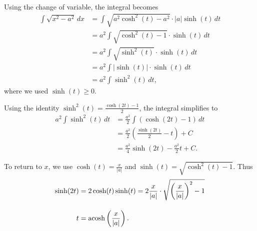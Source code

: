 

Using the change of variable, the integral becomes
\begin{align*}
   \int \sqrt{x^2 - a^2} \, dx  &=  \int \sqrt{a^2 \cosh^2(t) - a^2} \cdot |a| \sinh(t) \, dt \\[1em]
   &= a^2 \int \sqrt{\cosh^2(t) - 1} \cdot \sinh(t) \, dt \\[1em]
   &= a^2 \int \sqrt{\sinh^2(t)} \cdot \sinh(t) \, dt \\[1em]
     &= a^2 \int |\sinh(t)| \cdot \sinh(t) \, dt \\[1em]
    &= a^2 \int \sinh^2(t) \, dt,
\end{align*}
where we used $\sinh(t) \ge 0$.

Using the identity \( \sinh^2(t) = \frac{\cosh(2t) - 1}{2} \), the integral simplifies to
\begin{align*}
     a^2 \int \sinh^2(t) \, dt & = \frac{a^2}{2} \int (\cosh(2t) - 1) \, dt \\[1em] 
     &= \frac{a^2}{2} \left( \frac{\sinh(2t)}{2} - t \right) + C \\
    &= \frac{a^2}{4} \sinh(2t) - \frac{a^2}{2} t + C.
\end{align*}


To return to \( x \), we use \( \cosh(t) = \frac{x}{|a|} \) and \( \sinh(t) = \sqrt{\cosh^2(t) -1}\). Thus
\begin{align*}
    \sinh(2t) &= 2\cosh(t) \sinh(t) =2 \frac{x}{|a|} \cdot \sqrt{ \left(\frac{x}{|a|}\right)^2 - 1 } \\[1em]
    t &= \mathrm{acosh} \left( \frac{x}{|a|} \right).
\end{align*}


